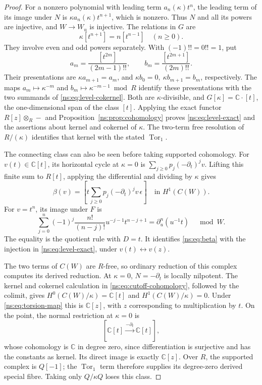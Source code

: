 \begin{proof}
For a nonzero polynomial with leading term \(a_n(\kappa)t^n\),
the leading term of its image under \(N\) is
\(\kappa a_n(\kappa)t^{n+1}\), which is nonzero.
Thus \(N\) and all its powers are injective, and \(W\to W_u\)
is injective.  The relations in \(G\) are
\[
 \kappa[t^{n+1}]=n[t^{n-1}]\quad(n\geq0).
\]
They involve even and odd powers separately.  With
\((-1)!!=0!!=1\), put
\[
 a_m=\frac{[t^{2m}]}{(2m-1)!!},\qquad
 b_m=\frac{[t^{2m+1}]}{(2m)!!}.
\]
Their presentations are \(\kappa a_{m+1}=a_m\), and
\(\kappa b_0=0,\ \kappa b_{m+1}=b_m\), respectively.
The maps \(a_m\mapsto\kappa^{-m}\) and
\(b_m\mapsto\kappa^{-m-1}\bmod R\) identify these presentations
with the two summands of \eqref{ns:eq:level-cokernel}.
Both are \(\kappa\)-divisible, and
\(G[\kappa]=\mathbb C\cdot[t]\), the one-dimensional span of the
class \([t]\).  Applying the exact functor \(R[z]\otimes_R-\)
and Proposition~\ref{ns:prop:cohomology} proves
\eqref{ns:eq:level-exact} and the assertions about kernel and cokernel
of \(\kappa\).  The two-term free resolution of \(R/(\kappa)\)
identifies that kernel with the stated \(\operatorname{Tor}_1\).

The connecting class can also be seen before taking supported
cohomology.  For \(v(t)\in\mathbb C[t]\), its horizontal cycle
at \(\kappa=0\) is \(\sum_{j\geq0}p_j(-\partial_t)^jv\).
Lifting this finite sum to \(R[t]\), applying the differential
and dividing by \(\kappa\) gives
\begin{equation}\label{ns:eq:beta}
 \beta(v)=\left[t\sum_{j\geq0}p_j(-\partial_t)^jv\,\epsilon\right]
       \quad\text{in }H^1(C(W)).
\end{equation}
For \(v=t^n\), its image under \(F\) is
\[
 \sum_{j=0}^n(-1)^j\frac{n!}{(n-j)!}
          u^{-j-1}t^{n-j+1}
       =\partial_u^n(u^{-1}t)\quad\bmod W.
\]
The equality is the quotient rule with \(D=t\).
It identifies \eqref{ns:eq:beta} with the injection in
\eqref{ns:eq:level-exact}, under \(v(t)\leftrightarrow v(z)\).

The two terms of \(C(W)\) are \(R\)-free, so ordinary reduction
of this complex computes its derived reduction.  At \(\kappa=0\),
\(N=-\partial_t\) is locally nilpotent.  The kernel and cokernel
calculation in \eqref{ns:eq:cutoff-cohomology}, followed by the
colimit, gives \(H^0(C(W)/\kappa)=\mathbb C[t]\) and
\(H^1(C(W)/\kappa)=0\).  Under \eqref{ns:eq:torsion-map} this is
\(\mathbb C[z]\), with \(z\) corresponding to multiplication by
\(t\).  On the point, the normal restriction at \(\kappa=0\) is
\[
 [\mathbb C[t]\xrightarrow{-\partial_t}\mathbb C[t]],
\]
whose cohomology is \(\mathbb C\) in degree zero, since
differentiation is surjective and has the constants as kernel.
Its direct image is exactly \(\mathbb C[z]\).
Over \(R\), the supported complex is \(Q[-1]\); the
\(\operatorname{Tor}_1\) term therefore supplies its degree-zero
derived special fibre.  Taking only \(Q/\kappa Q\) loses this class.
\end{proof}

